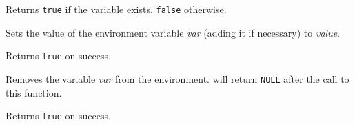 Returns {\tt true} if the variable exists, {\tt false} otherwise.


\label{wxsetenv}


Sets the value of the environment variable {\it var} (adding it if necessary)
to {\it value}.

Returns {\tt true} on success.


\label{wxunsetenv}


Removes the variable {\it var} from the environment.
 will return {\tt NULL} after the call to this
function.

Returns {\tt true} on success.

